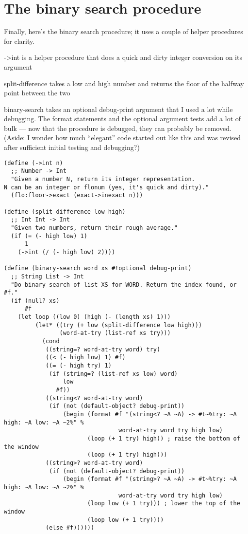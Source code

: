 \documentclass[12pt,openright,draft]{book}
\begin{document}
\section{The binary search procedure}

Finally, here's the binary search procedure; it uses a couple of helper procedures for clarity. 

->int is a helper procedure that does a quick and dirty integer conversion on its argument 

split-difference takes a low and high number and returns the floor of the halfway point between the two 

binary-search takes an optional debug-print argument that I used a lot while debugging. The format statements and the optional argument tests add a lot of bulk --- now that the procedure is debugged, they can probably be removed. (Aside: I wonder how much ``elegant'' code started out like this and was revised after sufficient initial testing and debugging?) 

\begin{verbatim}
(define (->int n)
  ;; Number -> Int
  "Given a number N, return its integer representation.
N can be an integer or flonum (yes, it's quick and dirty)."
  (flo:floor->exact (exact->inexact n)))

(define (split-difference low high)
  ;; Int Int -> Int
  "Given two numbers, return their rough average."
  (if (= (- high low) 1)
      1
    (->int (/ (- high low) 2))))

(define (binary-search word xs #!optional debug-print)
  ;; String List -> Int
  "Do binary search of list XS for WORD. Return the index found, or #f."
  (if (null? xs)
      #f
    (let loop ((low 0) (high (- (length xs) 1)))
         (let* ((try (+ low (split-difference low high)))
                (word-at-try (list-ref xs try)))
           (cond
            ((string=? word-at-try word) try)
            ((< (- high low) 1) #f)
            ((= (- high try) 1) 
             (if (string=? (list-ref xs low) word)
                 low
               #f))
            ((string<? word-at-try word)
             (if (not (default-object? debug-print))
                 (begin (format #f "(string<? ~A ~A) -> #t~%try: ~A high: ~A low: ~A ~2%" %
                                 word-at-try word try high low)
                        (loop (+ 1 try) high)) ; raise the bottom of the window
                        (loop (+ 1 try) high)))
            ((string>? word-at-try word)
             (if (not (default-object? debug-print))
                 (begin (format #f "(string>? ~A ~A) -> #t~%try: ~A high: ~A low: ~A ~2%" %
                                 word-at-try word try high low)
                        (loop low (+ 1 try))) ; lower the top of the window
                        (loop low (+ 1 try))))
            (else #f))))))
\end{verbatim}
\end{document}
